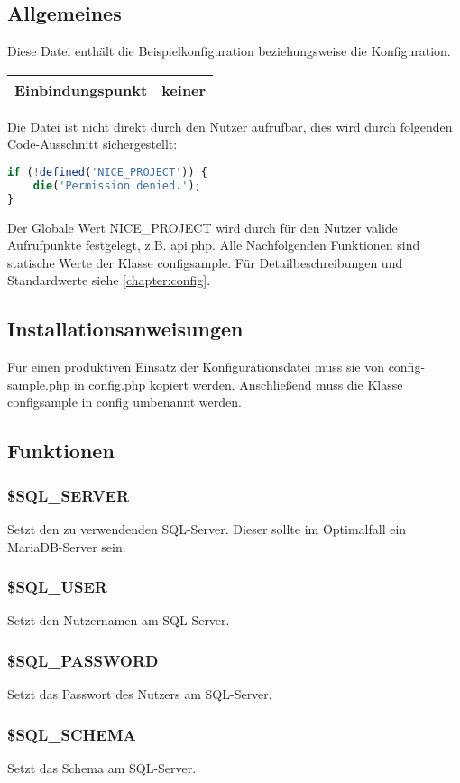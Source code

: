 \subsection{Allgemeines} Diese Datei enthält die Beispielkonfiguration beziehungsweise die Konfiguration.
\begin{table}[H]
	\begin{tabular}{|c|p{11cm}|}
		\hline
		\textbf{Einbindungspunkt} & keiner \\ \hline
	\end{tabular}
\end{table}
Die Datei ist nicht direkt durch den Nutzer aufrufbar, dies wird durch folgenden Code-Ausschnitt sichergestellt:
\begin{lstlisting}[language=php]
if (!defined('NICE_PROJECT')) {
	die('Permission denied.');
}
\end{lstlisting}
Der Globale Wert {\glqq NICE\_PROJECT\grqq} wird durch für den Nutzer valide Aufrufpunkte festgelegt, z.B. {\glqq api.php\grqq}. Alle Nachfolgenden {\glqq Funktionen\grqq} sind statische Werte der Klasse {\glqq configsample\grqq}. Für Detailbeschreibungen und Standardwerte siehe \autoref{chapter:config}.
\subsection{Installationsanweisungen} Für einen produktiven Einsatz der Konfigurationsdatei muss sie von {\glqq config-sample.php\grqq} in {\glqq config.php\grqq} kopiert werden. Anschließend muss die Klasse {\glqq configsample\grqq} in {\glqq config\grqq} umbenannt werden.
\subsection{Funktionen}
\subsubsection{\$SQL\_SERVER} Setzt den zu verwendenden SQL-Server. Dieser sollte im Optimalfall ein MariaDB-Server sein.
\subsubsection{\$SQL\_USER} Setzt den Nutzernamen am SQL-Server.
\subsubsection{\$SQL\_PASSWORD} Setzt das Passwort des Nutzers am SQL-Server.
\subsubsection{\$SQL\_SCHEMA} Setzt das Schema am SQL-Server.

